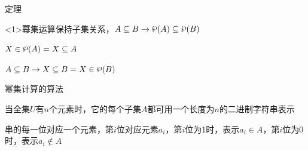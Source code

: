 \documentclass[xetex,10pt,aspectratio=43]{beamer}
\newcommand{\powerset}{\raisebox{.15\baselineskip}{\ensuremath{\wp}}}
\begin{document}
	\begin{frame}{定理}
		
		\begin{block}<1>{幂集运算保持子集关系，$A\subseteq B\rightarrow\powerset(A)\subseteq\powerset(B)$}
			
			$X\in\powerset(A)=X\subseteq A$
			
			$A\subseteq B\rightarrow X\subseteq B=X\in\powerset(B)$	
						
		\end{block}
	\end{frame}

	\begin{frame}[fragile]{幂集计算的算法}
		
		当全集$U$有$n$个元素时，它的每个子集$A$都可用一个长度为$n$的二进制字符串表示
		
		串的每一位对应一个元素，第$i$位对应元素$a_i$，第$i$位为1时，表示$a_i\in A$，第$i$位为0时，表示$a_i\notin A$
		
	\end{frame}
\end{document}
